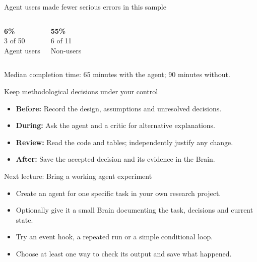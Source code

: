 \begin{frame}{Agent users made fewer serious errors in this sample}
\vspace{0.8em}
\begin{columns}[T,onlytextwidth]
\begin{center}
{\color{ink}\fontsize{28}{32}\selectfont\bfseries 6\%}\\[1.05em]
{\small 3 of 50}\\[0.55em]
Agent users
\end{center}
\begin{center}
{\color{accent}\fontsize{28}{32}\selectfont\bfseries 55\%}\\[1.05em]
{\small 6 of 11}\\[0.55em]
Non-users
\end{center}
\end{columns}
\vspace{1.15em}
Median completion time: 65 minutes with the agent; 90 minutes without.
\end{frame}

\begin{frame}{Keep methodological decisions under your control}
\begin{itemize}\setlength{\itemsep}{0.5em}
\item \textbf{Before:} Record the design, assumptions and unresolved decisions.
\item \textbf{During:} Ask the agent and a critic for alternative explanations.
\item \textbf{Review:} Read the code and tables; independently justify any change.
\item \textbf{After:} Save the accepted decision and its evidence in the Brain.
\end{itemize}
\end{frame}

\begin{frame}{Next lecture: Bring a working agent experiment}
\begin{itemize}\setlength{\itemsep}{0.45em}
\item Create an agent for one specific task in your own research project.
\item Optionally give it a small Brain documenting the task, decisions and current state.
\item Try an event hook, a repeated run or a simple conditional loop.
\item Choose at least one way to check its output and save what happened.
\end{itemize}
\end{frame}


